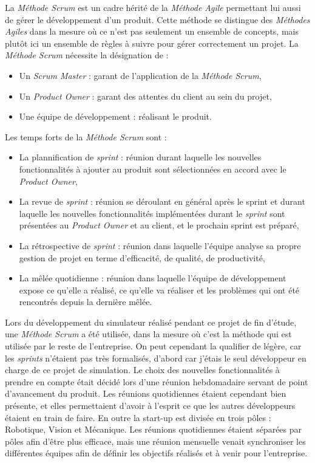 			La \textit{Méthode Scrum} est un cadre hérité de la \textit{Méthode Agile} permettant lui aussi de gérer le développement d'un produit. Cette méthode se distingue des \textit{Méthodes Agiles} dans la mesure où ce n'est pas seulement un ensemble de concepts, mais plutôt ici un ensemble de règles à suivre pour gérer correctement un projet. La \textit{Méthode Scrum} nécessite la désignation de :

			\begin{itemize}
				\item Un \textit{Scrum Master} : garant de l'application de la \textit{Méthode Scrum},
				\item Un \textit{Product Owner} : garant des attentes du client au sein du projet,
				\item Une équipe de développement : réalisant le produit.
			\end{itemize}

			Les temps forts de la \textit{Méthode Scrum} sont :

			\begin{itemize}
				\item La plannification de \textit{sprint} : réunion durant laquelle les nouvelles fonctionnalités à ajouter au produit sont sélectionnées en accord avec le \textit{Product Owner},
				\item La revue de \textit{sprint} : réunion se déroulant en général après le sprint et durant laquelle les nouvelles fonctionnalités implémentées durant le \textit{sprint} sont présentées au \textit{Product Owner} et au client, et le prochain sprint est préparé,
				\item La rétrospective de \textit{sprint} : réunion dans laquelle l'équipe analyse sa propre gestion de projet en terme d'efficacité, de qualité, de productivité,
				\item La mêlée quotidienne : réunion dans laquelle l'équipe de développement expose ce qu'elle a réalisé, ce qu'elle va réaliser et les problèmes qui ont été rencontrés depuis la dernière mêlée.
			\end{itemize}
		
			Lors du développement du simulateur réalisé pendant ce projet de fin d'étude, une \textit{Méthode Scrum} a été utilisée, dans la mesure où c'est la méthode qui est utilisée par le reste de l'entreprise. On peut cependant la qualifier de légère, car les \textit{sprints} n'étaient pas très formalisés, d'abord car j'étais le seul développeur en charge de ce projet de simulation. Le choix des nouvelles fonctionnalités à prendre en compte était décidé lors d'une réunion hebdomadaire servant de point d'avancement du produit. Les réunions quotidiennes étaient cependant bien présente, et elles permettaient d'avoir à l'esprit ce que les autres développeurs étaient en train de faire. En outre la start-up est divisée en trois pôles : Robotique, Vision et Mécanique. Les réunions quotidiennes étaient séparées par pôles afin d'être plus efficace, mais une réunion mensuelle venait synchroniser les différentes équipes afin de définir les objectifs réalisés et à venir pour l'entreprise.

